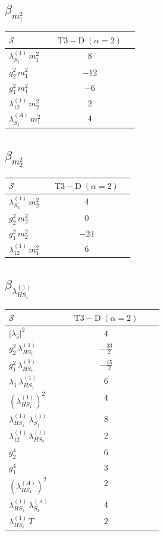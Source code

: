 \documentclass[9pt]{article}
\begin{document}
\subsection*{$ \beta_{m_1^{2}} $}
\begin{longtable}{@{}p{0.31\linewidth}c@{}}
\toprule
$\mathcal{S}$ & $ \mathrm{T3-D}\;(\alpha=2) $ \\
\midrule
$ \lambda_{S_1}^{(1)}\,m_1^{2} $ & $ 8 $ \\
$ g_2^2\,m_1^{2} $ & $ -12 $ \\
$ g_1^2\,m_1^{2} $ & $ -6 $ \\
$ \lambda_{12}^{(1)}\,m_2^{2} $ & $ 2 $ \\
$ \lambda_{S_1}^{(A)}\,m_1^{2} $ & $ 4 $ \\
\bottomrule
\end{longtable}
\subsection*{$ \beta_{m_2^{2}} $}
\begin{longtable}{@{}p{0.31\linewidth}c@{}}
\toprule
$\mathcal{S}$ & $ \mathrm{T3-D}\;(\alpha=2) $ \\
\midrule
$ \lambda_{S_2}^{(1)}\,m_2^{2} $ & $ 4 $ \\
$ g_2^2\,m_2^{2} $ & $ 0 $ \\
$ g_1^2\,m_2^{2} $ & $ -24 $ \\
$ \lambda_{12}^{(1)}\,m_1^{2} $ & $ 6 $ \\
\bottomrule
\end{longtable}
\subsection*{$ \beta_{\lambda_{HS_1}^{(1)}} $}
\begin{longtable}{@{}p{0.31\linewidth}c@{}}
\toprule
$\mathcal{S}$ & $ \mathrm{T3-D}\;(\alpha=2) $ \\
\midrule
$ |\lambda_5|^2 $ & $ 4 $ \\
$ g_2^2\,\lambda_{HS_1}^{(1)} $ & $ - \frac{33}{2} $ \\
$ g_1^2\,\lambda_{HS_1}^{(1)} $ & $ - \frac{15}{2} $ \\
$ \lambda_1\,\lambda_{HS_1}^{(1)} $ & $ 6 $ \\
$ \left(\lambda_{HS_1}^{(1)}\right)^2 $ & $ 4 $ \\
$ \lambda_{HS_1}^{(1)}\,\lambda_{S_1}^{(1)} $ & $ 8 $ \\
$ \lambda_{12}^{(1)}\,\lambda_{HS_2}^{(1)} $ & $ 2 $ \\
$ g_2^4 $ & $ 6 $ \\
$ g_1^4 $ & $ 3 $ \\
$ \left(\lambda_{HS_1}^{(A)}\right)^2 $ & $ 2 $ \\
$ \lambda_{HS_1}^{(1)}\,\lambda_{S_1}^{(A)} $ & $ 4 $ \\
$ \lambda_{HS_1}^{(1)}\,T $ & $ 2 $ \\
\bottomrule
\end{longtable}
\end{document}
